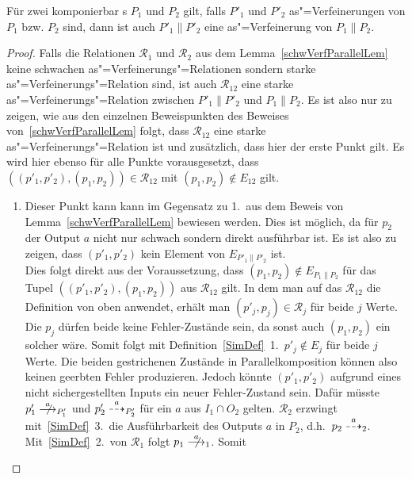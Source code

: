 \begin{Kor}
  \label{verfParallelKor}
  Für zwei komponierbar \MEIO{}s $P_1$ und $P_2$ gilt, falls $P'_1$ und $P'_2$
  as"=Verfeinerungen von $P_1$ bzw. $P_2$ sind, dann ist auch $P'_1\|P'_2$ eine
  as"=Verfeinerung von $P_1\|P_2$.
\end{Kor}
\begin{proof}
  Falls die Relationen $\mathcal{R}_1$ und $\mathcal{R}_2$ aus dem
  Lemma~\ref{schwVerfParallelLem} keine schwachen as"=Verfeinerungs"=Relationen
  sondern starke as"=Verfeinerungs"=Relation sind, ist auch $\mathcal{R}_{12}$
  eine starke as"=Verfeinerungs"=Relation zwischen $P'_1\|P'_2$ und $P_1\|P_2$.
  Es ist also nur zu zeigen, wie aus den einzelnen Beweispunkten des Beweises
  von~\ref{schwVerfParallelLem} folgt, dass $\mathcal{R}_{12}$ eine starke
  as"=Verfeinerungs"=Relation ist und zusätzlich, dass hier der erste Punkt
  gilt. Es wird hier ebenso für alle Punkte vorausgesetzt, dass
  $((p'_1,p'_2),(p_1,p_2))\in\mathcal{R}_{12}$ mit $(p_1,p_2)\notin E_{12}$
  gilt.
  \begin{enumerate}
    \item Dieser Punkt kann kann im Gegensatz zu 1.\ aus dem Beweis von
      Lemma~\ref{schwVerfParallelLem} bewiesen werden. Dies ist möglich, da für
      $p_2$ der Output $a$ nicht nur schwach sondern direkt ausführbar ist. Es
      ist also zu zeigen, dass $(p'_1,p'_2)$ kein Element von $E_{P'_1\|P'_2}$
      ist.\\
      Dies folgt direkt aus der Voraussetzung, dass $(p_1,p_2)\notin
      E_{P_1\|P_2}$ für das Tupel $((p'_1,p'_2),(p_1,p_2))$ aus
      $\mathcal{R}_{12}$ gilt. In dem man auf das $\mathcal{R}_{12}$ die
      Definition von oben anwendet, erhält man $(p'_j,p_j)\in\mathcal{R}_j$ für
      beide $j$ Werte. Die $p_j$ dürfen beide keine Fehler-Zustände sein, da
      sonst auch $(p_1,p_2)$ ein solcher wäre. Somit folgt mit
      Definition~\ref{SimDef}~1.\ $p'_j\notin E_j$ für beide $j$ Werte. Die
      beiden gestrichenen Zustände in Parallelkomposition können also keinen
      geerbten Fehler produzieren. Jedoch könnte $(p'_1,p'_2)$ aufgrund eines
      nicht sichergestellten Inputs ein neuer Fehler-Zustand sein. Dafür müsste
      \oBdA{} $p'_1\nmust[a]_{P'_1}$ und $p'_2\may[a]_{P'_2}$ für ein $a$ aus
      $I_1\cap O_2$ gelten. $\mathcal{R}_2$ erzwingt mit~\ref{SimDef}~3.\ die
      Ausführbarkeit des Outputs $a$ in $P_2$, d.h.\ $p_2 \may[a]_2$.
      Mit~\ref{SimDef}~2.\ von $\mathcal{R}_1$ folgt $p_1 \nmust[a]_1$. Somit

\end{enumerate}
\end{proof}
